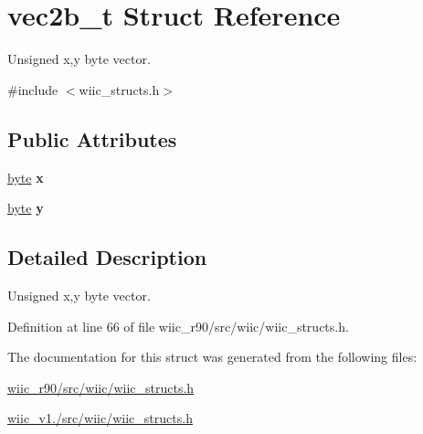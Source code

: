 \hypertarget{structvec2b__t}{\section{vec2b\-\_\-t Struct Reference}
\label{structvec2b__t}
}


Unsigned x,y byte vector.  




{\ttfamily \#include $<$wiic\-\_\-structs.\-h$>$}

\subsection*{Public Attributes}
\begin{DoxyCompactItemize}
\item 
\hypertarget{structvec2b__t_a770aacd26e2799bccfecd8eeb4f16092}{\hyperlink{wiic__r90_2src_2wiic_2wiic__macros_8h_a0c8186d9b9b7880309c27230bbb5e69d}{byte} {\bfseries x}}\label{structvec2b__t_a770aacd26e2799bccfecd8eeb4f16092}

\item 
\hypertarget{structvec2b__t_ad69850e7b8fd19a9cb69431d5dbfab83}{\hyperlink{wiic__r90_2src_2wiic_2wiic__macros_8h_a0c8186d9b9b7880309c27230bbb5e69d}{byte} {\bfseries y}}\label{structvec2b__t_ad69850e7b8fd19a9cb69431d5dbfab83}

\end{DoxyCompactItemize}


\subsection{Detailed Description}
Unsigned x,y byte vector. 

Definition at line 66 of file wiic\-\_\-r90/src/wiic/wiic\-\_\-structs.\-h.



The documentation for this struct was generated from the following files\-:\begin{DoxyCompactItemize}
\item 
\hyperlink{wiic__r90_2src_2wiic_2wiic__structs_8h}{wiic\-\_\-r90/src/wiic/wiic\-\_\-structs.\-h}\item 
\hyperlink{wiic__v1_81_2src_2wiic_2wiic__structs_8h}{wiic\-\_\-v1./src/wiic/wiic\-\_\-structs.\-h}\end{DoxyCompactItemize}
